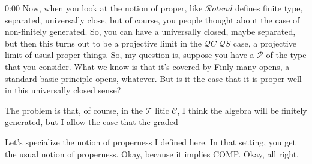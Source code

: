 \begin{unfinished}{0:00}
Now, when you look at the notion of proper, like $\mathcal{R}otend$ defines finite type, separated, universally close, but of course, you people thought about the case of non-finitely generated. So, you can have a universally closed, maybe separated, but then this turns out to be a projective limit in the $\mathcal{Q}C$ $\mathcal{Q}S$ case, a projective limit of usual proper things. So, my question is, suppose you have a $\mathcal{P}$ of the type that you consider. What we know is that it's covered by Finly many opens, a standard basic principle opens, whatever. But is it the case that it is proper well in this universally closed sense?

The problem is that, of course, in the $\mathcal{T}$ litic $\mathcal{C}$, I think the algebra will be finitely generated, but I allow the case that the graded

Let's specialize the notion of properness I defined here. In that setting, you get the usual notion of properness. Okay, because it implies COMP. Okay, all right.

\end{unfinished}